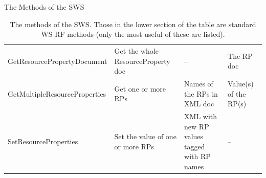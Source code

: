 \documentclass[a4paper]{article}
\begin{document}
\begin{section}{The Methods of the SWS}
\begin{table}
\begin{center}
\begin{tabular}{l|p{4cm}|p{4cm}|p{3cm}}
GetResourcePropertyDocument & Get the whole ResourceProperty doc 
& -- & The RP doc\\

GetMultipleResourceProperties & Get one or more RPs 
& Names of the RPs in XML doc & Value(s) of the RP(s) \\
SetResourceProperties & Set the value of one or more RPs 
& XML with new RP values tagged with RP names & -- \\
\hline\hline
\end{tabular}
\end{center}
\caption{The methods of the SWS.  Those in the lower section of the table 
are standard WS-RF methods (only the most useful of these are listed).}
\label{table:SWSmethods}
\end{table}

\end{section}
\end{document}
